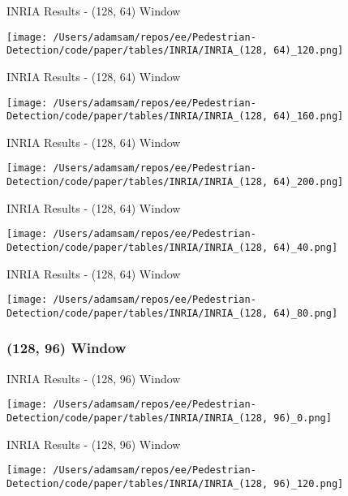 \begin{table}
    \caption{INRIA Results - (128, 64) Window}
    \texttt{[image: /Users/adamsam/repos/ee/Pedestrian-Detection/code/paper/tables/INRIA/INRIA\_(128, 64)\_120.png]}
    \label{tab:INRIA_(128, 64)_120}
\end{table}

\begin{table}
    \caption{INRIA Results - (128, 64) Window}
    \texttt{[image: /Users/adamsam/repos/ee/Pedestrian-Detection/code/paper/tables/INRIA/INRIA\_(128, 64)\_160.png]}
    \label{tab:INRIA_(128, 64)_160}
\end{table}

\begin{table}
    \caption{INRIA Results - (128, 64) Window}
    \texttt{[image: /Users/adamsam/repos/ee/Pedestrian-Detection/code/paper/tables/INRIA/INRIA\_(128, 64)\_200.png]}
    \label{tab:INRIA_(128, 64)_200}
\end{table}

\begin{table}
    \caption{INRIA Results - (128, 64) Window}
    \texttt{[image: /Users/adamsam/repos/ee/Pedestrian-Detection/code/paper/tables/INRIA/INRIA\_(128, 64)\_40.png]}
    \label{tab:INRIA_(128, 64)_40}
\end{table}

\begin{table}
    \caption{INRIA Results - (128, 64) Window}
    \texttt{[image: /Users/adamsam/repos/ee/Pedestrian-Detection/code/paper/tables/INRIA/INRIA\_(128, 64)\_80.png]}
    \label{tab:INRIA_(128, 64)_80}
\end{table}

\subsubsection*{(128, 96) Window}

\begin{table}
    \caption{INRIA Results - (128, 96) Window}
    \texttt{[image: /Users/adamsam/repos/ee/Pedestrian-Detection/code/paper/tables/INRIA/INRIA\_(128, 96)\_0.png]}
    \label{tab:INRIA_(128, 96)_0}
\end{table}

\begin{table}
    \caption{INRIA Results - (128, 96) Window}
    \texttt{[image: /Users/adamsam/repos/ee/Pedestrian-Detection/code/paper/tables/INRIA/INRIA\_(128, 96)\_120.png]}
    \label{tab:INRIA_(128, 96)_120}
\end{table}

